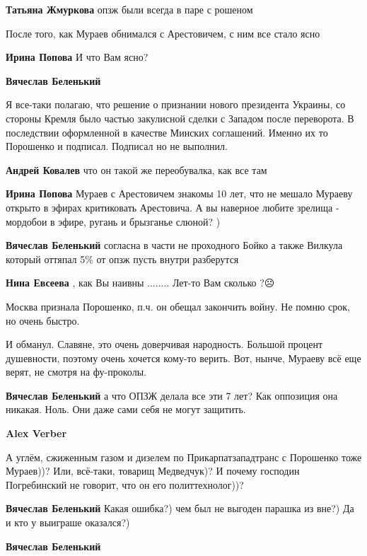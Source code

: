 \begin{itemize}
\begin{itemize}
\textbf{Татьяна Жмуркова} опзж были всегда в паре с рошеном

После того, как Мураев обнимался с Арестовичем, с ним все стало ясно

\textbf{Ирина Попова} И что Вам ясно?

\textbf{Вячеслав Беленький} 

Я все-таки полагаю, что решение о признании нового президента Украины, со
стороны Кремля было частью закулисной сделки с Западом после переворота. В
последствии оформленной в качестве Минских соглашений. Именно их то Порошенко и
подписал. Подписал но не выполнил.


\textbf{Андрей Ковалев} что он такой же переобувалка, как все там

\textbf{Ирина Попова} Мураев с Арестовичем знакомы 10 лет, что не мешало Мураеву открыто в эфирах критиковать Арестовича. А вы наверное любите зрелища - мордобои в эфире, ругань и брызганье слюной? )

\textbf{Вячеслав Беленький} согласна в части не проходного Бойко а также Вилкула который оттяпал 5\% от опзж пусть внутри разберутся

\textbf{Нина Евсеева} , как Вы наивны ........ Лет-то Вам сколько ?☹️


Москва признала Порошенко, п.ч. он обещал закончить войну. Не помню срок, но
очень быстро.

И обманул. Славяне, это очень доверчивая народность. Большой процент
душевности, поэтому очень хочется кому-то верить. Вот, нынче, Мураеву всё еще
верят, не смотря на фу-проколы.

\textbf{Вячеслав Беленький} а что ОПЗЖ делала все эти 7 лет? Как оппозиция она никакая. Ноль. Они даже сами себя не могут защитить.

\textbf{Alex Verber} 

А углём, сжиженным газом и дизелем по Прикарпатзападтранс с Порошенко тоже
Мураев))? Или, всё-таки, товарищ Медведчук)? И почему господин Погребинский не
говорит, что он его политтехнолог))?

\textbf{Вячеслав Беленький} Какая ошибка?) чем был не выгоден парашка из вне?)
Да и кто у выиграше оказался?)

\textbf{Вячеслав Беленький} 


\end{itemize}
\end{itemize}
